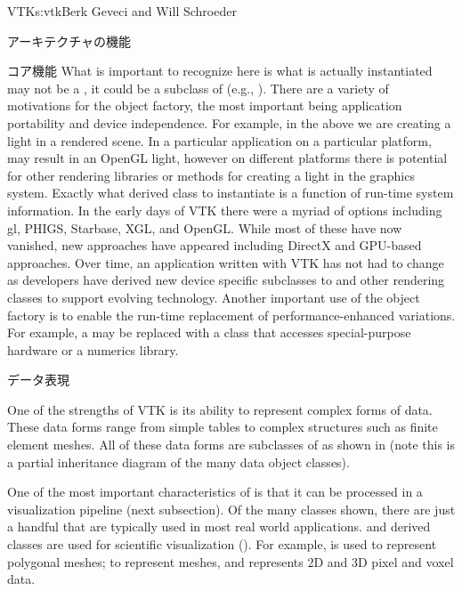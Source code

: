 \begin{aosachapter}{VTK}{s:vtk}{Berk Geveci and Will Schroeder}
\begin{aosasect1}{アーキテクチャの機能}
\begin{aosasect2}{コア機能}
What is important to recognize here is what is actually instantiated
may not be a , it could be a subclass of
 (e.g., ). There are a variety of
motivations for the object factory, the most important being
application portability and device independence. For example, in the
above we are creating a light in a rendered scene. In a particular
application on a particular platform,  may result
in an OpenGL light, however on different platforms there is potential
for other rendering libraries or methods for creating a light in the
graphics system. Exactly what derived class to instantiate is a
function of run-time system information. In the early days of VTK
there were a myriad of options including gl, PHIGS, Starbase, XGL, and
OpenGL\@. While most of these have now vanished, new approaches have
appeared including DirectX and GPU-based approaches. Over time, an
application written with VTK has not had to change as developers have
derived new device specific subclasses to  and other
rendering classes to support evolving technology. Another important
use of the object factory is to enable the run-time replacement of
performance-enhanced variations. For example, a  may
be replaced with a class that accesses special-purpose hardware or a
numerics library.

\end{aosasect2}

\begin{aosasect2}{データ表現}

One of the strengths of VTK is its ability to represent complex forms
of data. These data forms range from simple tables to complex
structures such as finite element meshes. All of these data forms are
subclasses of  as shown in
 (note this is a partial inheritance
diagram of the many data object classes).


One of the most important characteristics of  is
that it can be processed in a visualization pipeline (next
subsection). Of the many classes shown, there are just a handful that
are typically used in most real world applications. 
and derived classes are used for scientific visualization
(). For example,  is
used to represent polygonal meshes;  to
represent meshes, and  represents 2D and 3D pixel
and voxel data.


\end{aosasect2}
\end{aosasect1}
\end{aosachapter}
